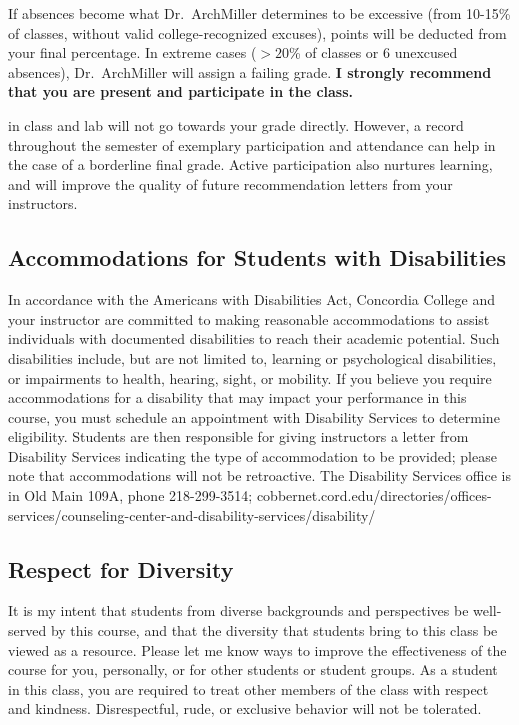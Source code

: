 \documentclass{tufte-handout}
\begin{document}
\begin{fullwidth}
If absences become what Dr.~ArchMiller determines to be excessive (from 10-15\% of classes, without valid college-recognized excuses), points will be deducted from your final percentage. In extreme cases ($>20$\% of classes or 6 unexcused absences), Dr.~ArchMiller will assign a failing grade. \textbf{I strongly recommend that you are present and participate in the class.}

 in class and lab will not go towards your grade directly. However, a record throughout the semester of exemplary participation and attendance can help in the case of a borderline final grade. Active participation also nurtures learning, and will improve the quality of future recommendation letters from your instructors.  

\subsection{Accommodations for Students with Disabilities}

In accordance with the Americans with Disabilities Act, Concordia College and your instructor are committed to making reasonable accommodations to assist individuals with documented disabilities to reach their academic potential. Such disabilities include, but are not limited to, learning or psychological disabilities, or impairments to health, hearing, sight, or mobility. If you believe you require accommodations for a disability that may impact your performance in this course, you must schedule an appointment with Disability Services to determine eligibility. Students are then responsible for giving instructors a letter from Disability Services indicating the type of accommodation to be provided; please note that accommodations will not be retroactive. The Disability Services office is in Old Main 109A, phone 218-299-3514; cobbernet.cord.edu/directories/offices-services/counseling-center-and-disability-services/disability/

\subsection{Respect for Diversity}

It is my intent that students from diverse backgrounds and perspectives be well-served by this course, and that the diversity that students bring to this class be viewed as a resource. Please let me know ways to improve the effectiveness of the course for you, personally, or for other students or student groups. As a student in this class, you are required to treat other members of the class with respect and kindness. Disrespectful, rude, or exclusive behavior will not be tolerated.


\end{fullwidth}
\end{document}
